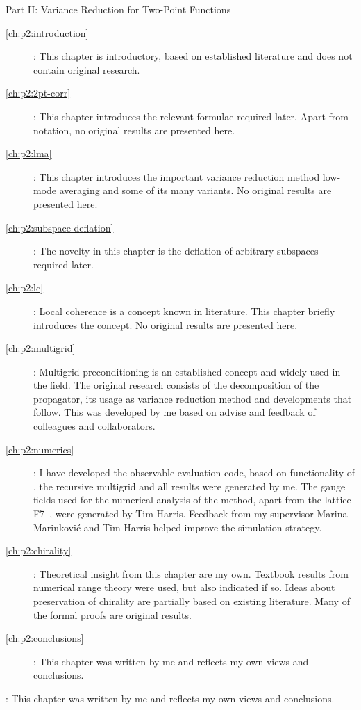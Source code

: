 \begin{description}
\item Part II: Variance Reduction for Two-Point Functions
   \begin{description}
   \item[\cref{ch:p2:introduction}]: This chapter is introductory, based on established literature and does not contain original research.
   \item[\cref{ch:p2:2pt-corr}]: This chapter introduces the relevant formulae required later. Apart from notation, no original results are presented here.
   \item[\cref{ch:p2:lma}]: This chapter introduces the important variance reduction method low-mode averaging and some of its many variants. No original results are presented here.
   \item[\cref{ch:p2:subspace-deflation}]: The novelty in this chapter is the deflation of arbitrary subspaces required later.
   \item[\cref{ch:p2:lc}]: Local coherence is a concept known in literature. This chapter briefly introduces the concept. No original results are presented here.
   \item[\cref{ch:p2:multigrid}]: Multigrid preconditioning is an established concept and widely used in the field. The original research consists of the decomposition of the propagator, its usage as variance reduction method and developments that follow. This was developed by me based on advise and feedback of colleagues and collaborators.
   \item[\cref{ch:p2:numerics}]: I have developed the observable evaluation code, based on functionality of \openqxd, the recursive multigrid and all results were generated by me. The gauge fields used for the numerical analysis of the method, apart from the lattice F7~\cite{online:cls}, were generated by Tim Harris. Feedback from my supervisor Marina Marinković and Tim Harris helped improve the simulation strategy.
   \item[\cref{ch:p2:chirality}]: Theoretical insight from this chapter are my own. Textbook results from numerical range theory were used, but also indicated if so. Ideas about preservation of chirality are partially based on existing literature. Many of the formal proofs are original results.
   \item[\cref{ch:p2:conclusions}]: This chapter was written by me and reflects my own views and conclusions.
   \end{description}
\item[\cref{ch:summary}]: This chapter was written by me and reflects my own views and conclusions.
\end{description}

